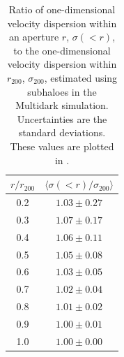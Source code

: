 \begin{table}\footnotesize
\begin{minipage}[b]{2in}
\centering
\begin{tabular}{c c}
\hline\hline
$r/r_{200}$ & $\langle\sigma(<r)/\sigma_{200}\rangle$ \\[0.5ex]
\hline
0.2 & $1.03\pm0.27$ \\
0.3 & $1.07\pm0.17$ \\
0.4 & $1.06\pm0.11$ \\
0.5 & $1.05\pm0.08$ \\
0.6 & $1.03\pm0.05$ \\
0.7 & $1.02\pm0.04$ \\
0.8 & $1.01\pm0.02$ \\
0.9 & $1.00\pm0.01$ \\
1.0 & $1.00\pm0.00$ \\
\hline
\end{tabular}
\end{minipage}
\begin{minipage}[c]{2.8in}
\vspace{-1.4cm}
\caption{Ratio of one-dimensional velocity dispersion within an aperture $r$, $\sigma(<r)$, to the one-dimensional velocity dispersion within $r_{200}$, $\sigma_{200}$, estimated using subhaloes in the Multidark simulation. Uncertainties are the standard deviations. These values are plotted in .}
\label{t:MDcorr}
\end{minipage}
\end{table}

